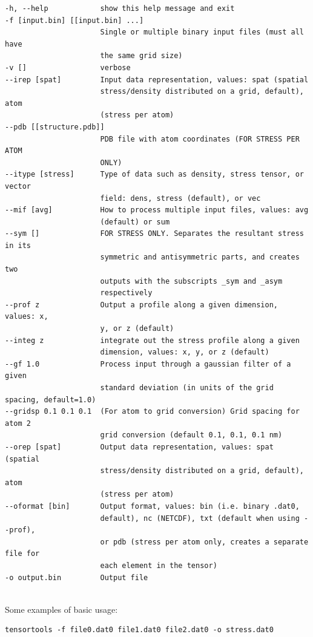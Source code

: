\documentclass[10pt,letterpaper,notitlepage]{article}
\begin{document}
\begin{lstlisting}[caption=Options for tensortools (tensortools -h)]
-h, --help            show this help message and exit
-f [input.bin] [[input.bin] ...]
                      Single or multiple binary input files (must all have
                      the same grid size)
-v []                 verbose
--irep [spat]         Input data representation, values: spat (spatial
                      stress/density distributed on a grid, default), atom
                      (stress per atom)
--pdb [[structure.pdb]]
                      PDB file with atom coordinates (FOR STRESS PER ATOM
                      ONLY)
--itype [stress]      Type of data such as density, stress tensor, or vector
                      field: dens, stress (default), or vec
--mif [avg]           How to process multiple input files, values: avg
                      (default) or sum
--sym []              FOR STRESS ONLY. Separates the resultant stress in its
                      symmetric and antisymmetric parts, and creates two
                      outputs with the subscripts _sym and _asym
                      respectively
--prof z              Output a profile along a given dimension, values: x,
                      y, or z (default)
--integ z             integrate out the stress profile along a given
                      dimension, values: x, y, or z (default)
--gf 1.0              Process input through a gaussian filter of a given
                      standard deviation (in units of the grid spacing, default=1.0)
--gridsp 0.1 0.1 0.1  (For atom to grid conversion) Grid spacing for atom 2
                      grid conversion (default 0.1, 0.1, 0.1 nm)
--orep [spat]         Output data representation, values: spat (spatial
                      stress/density distributed on a grid, default), atom
                      (stress per atom)
--oformat [bin]       Output format, values: bin (i.e. binary .dat0,
                      default), nc (NETCDF), txt (default when using --prof),
                      or pdb (stress per atom only, creates a separate file for
                      each element in the tensor)
-o output.bin         Output file
  
\end{lstlisting}

Some examples of basic usage:

\begin{lstlisting}[caption={Averaging multiple input *.dat0 files}]
tensortools -f file0.dat0 file1.dat0 file2.dat0 -o stress.dat0
\end{lstlisting}
\end{document}
